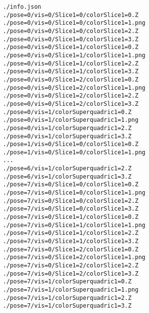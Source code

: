 \begin{verbatim}
./info.json
./pose=0/vis=0/Slice1=0/colorSlice1=0.Z
./pose=0/vis=0/Slice1=0/colorSlice1=1.png
./pose=0/vis=0/Slice1=0/colorSlice1=2.Z
./pose=0/vis=0/Slice1=0/colorSlice1=3.Z
./pose=0/vis=0/Slice1=1/colorSlice1=0.Z
./pose=0/vis=0/Slice1=1/colorSlice1=1.png
./pose=0/vis=0/Slice1=1/colorSlice1=2.Z
./pose=0/vis=0/Slice1=1/colorSlice1=3.Z
./pose=0/vis=0/Slice1=2/colorSlice1=0.Z
./pose=0/vis=0/Slice1=2/colorSlice1=1.png
./pose=0/vis=0/Slice1=2/colorSlice1=2.Z
./pose=0/vis=0/Slice1=2/colorSlice1=3.Z
./pose=0/vis=1/colorSuperquadric1=0.Z
./pose=0/vis=1/colorSuperquadric1=1.png
./pose=0/vis=1/colorSuperquadric1=2.Z
./pose=0/vis=1/colorSuperquadric1=3.Z
./pose=1/vis=0/Slice1=0/colorSlice1=0.Z
./pose=1/vis=0/Slice1=0/colorSlice1=1.png
...
./pose=6/vis=1/colorSuperquadric1=2.Z
./pose=6/vis=1/colorSuperquadric1=3.Z
./pose=7/vis=0/Slice1=0/colorSlice1=0.Z
./pose=7/vis=0/Slice1=0/colorSlice1=1.png
./pose=7/vis=0/Slice1=0/colorSlice1=2.Z
./pose=7/vis=0/Slice1=0/colorSlice1=3.Z
./pose=7/vis=0/Slice1=1/colorSlice1=0.Z
./pose=7/vis=0/Slice1=1/colorSlice1=1.png
./pose=7/vis=0/Slice1=1/colorSlice1=2.Z
./pose=7/vis=0/Slice1=1/colorSlice1=3.Z
./pose=7/vis=0/Slice1=2/colorSlice1=0.Z
./pose=7/vis=0/Slice1=2/colorSlice1=1.png
./pose=7/vis=0/Slice1=2/colorSlice1=2.Z
./pose=7/vis=0/Slice1=2/colorSlice1=3.Z
./pose=7/vis=1/colorSuperquadric1=0.Z
./pose=7/vis=1/colorSuperquadric1=1.png
./pose=7/vis=1/colorSuperquadric1=2.Z
./pose=7/vis=1/colorSuperquadric1=3.Z

\end{verbatim}
